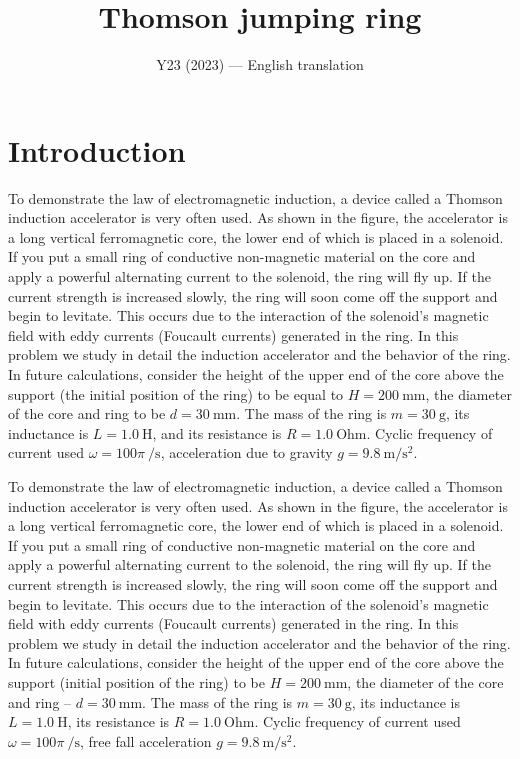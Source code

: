 \documentclass[11pt,a4paper]{article}
\title{\textbf{Thomson jumping ring}}
\author{\normalsize Y23 (2023) --- English translation}
\date{}
\begin{document}
\maketitle

\section*{Introduction}

To demonstrate the law of electromagnetic induction, a device called a Thomson induction accelerator is very often used. As shown in the figure, the accelerator is a long vertical ferromagnetic core, the lower end of which is placed in a solenoid. If you put a small ring of conductive non-magnetic material on the core and apply a powerful alternating current to the solenoid, the ring will fly up. If the current strength is increased slowly, the ring will soon come off the support and begin to levitate. This occurs due to the interaction of the solenoid's magnetic field with eddy currents (Foucault currents) generated in the ring. In this problem we study in detail the induction accelerator and the behavior of the ring. In future calculations, consider the height of the upper end of the core above the support (the initial position of the ring) to be equal to $H=200~\text{mm}$, the diameter of the core and ring to be $d=30~\text{mm}$. The mass of the ring is $m=30~\text{g}$, its inductance is $L=1{.}0~\text{H}$, and its resistance is $R=1.0~\text{Ohm}$. Cyclic frequency of current used $\omega=100\pi~\text{}/\text{s}$, acceleration due to gravity $g=9{.}8~\text{m}/\text{s}^2$.

To demonstrate the law of electromagnetic induction, a device called a Thomson induction accelerator is very often used. As shown in the figure, the accelerator is a long vertical ferromagnetic core, the lower end of which is placed in a solenoid. If you put a small ring of conductive non-magnetic material on the core and apply a powerful alternating current to the solenoid, the ring will fly up. If the current strength is increased slowly, the ring will soon come off the support and begin to levitate. This occurs due to the interaction of the solenoid's magnetic field with eddy currents (Foucault currents) generated in the ring. In this problem we study in detail the induction accelerator and the behavior of the ring. In future calculations, consider the height of the upper end of the core above the support (initial position of the ring) to be $H=200~\text{mm}$, the diameter of the core and ring – $d=30~\text{mm}$. The mass of the ring is $m=30~\text{g}$, its inductance is $L=1{.}0~\text{H}$, its resistance is $R=1.0~\text{Ohm}$. Cyclic frequency of current used $\omega=100\pi~\text{}/\text{s}$, free fall acceleration $g=9{.}8~\text{m}/\text{s}^2$.
\end{document}
